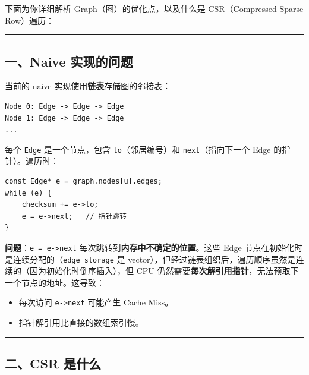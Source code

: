 \documentclass[11pt, a4paper]{article}
\begin{document}
\begin{aibox}
下面为你详细解析 Graph（图）的优化点，以及什么是 CSR（Compressed Sparse Row）遍历：

\begin{center}\rule{\textwidth}{0.4pt}\end{center}

\subsection*{一、Naive 实现的问题}

当前的 naive 实现使用\textbf{链表}存储图的邻接表：

\begin{tcolorbox}[colback=white,colframe=gray!50!white,boxrule=0.5pt,arc=2pt,left=5pt,right=5pt,top=5pt,bottom=5pt]
\begin{verbatim}
Node 0: Edge -> Edge -> Edge
Node 1: Edge -> Edge -> Edge
...
\end{verbatim}
\end{tcolorbox}

每个 \texttt{Edge} 是一个节点，包含 \texttt{to}（邻居编号）和 \texttt{next}（指向下一个 Edge 的指针）。遍历时：

\begin{tcolorbox}[colback=white,colframe=gray!50!white,boxrule=0.5pt,arc=2pt,left=5pt,right=5pt,top=5pt,bottom=5pt]
\begin{verbatim}
const Edge* e = graph.nodes[u].edges;
while (e) {
    checksum += e->to;
    e = e->next;   // 指针跳转
}
\end{verbatim}
\end{tcolorbox}

\textbf{问题}：\texttt{e = e->next} 每次跳转到\textbf{内存中不确定的位置}。这些 Edge 节点在初始化时是连续分配的（\texttt{edge\_storage} 是 vector），但经过链表组织后，遍历顺序虽然是连续的（因为初始化时倒序插入），但 CPU 仍然需要\textbf{每次解引用指针}，无法预取下一个节点的地址。这导致：
\begin{itemize}
    \item 每次访问 \texttt{e->next} 可能产生 Cache Miss。
    \item 指针解引用比直接的数组索引慢。
\end{itemize}

\begin{center}\rule{\textwidth}{0.4pt}\end{center}

\subsection*{二、CSR 是什么}


\end{aibox}
\end{document}
